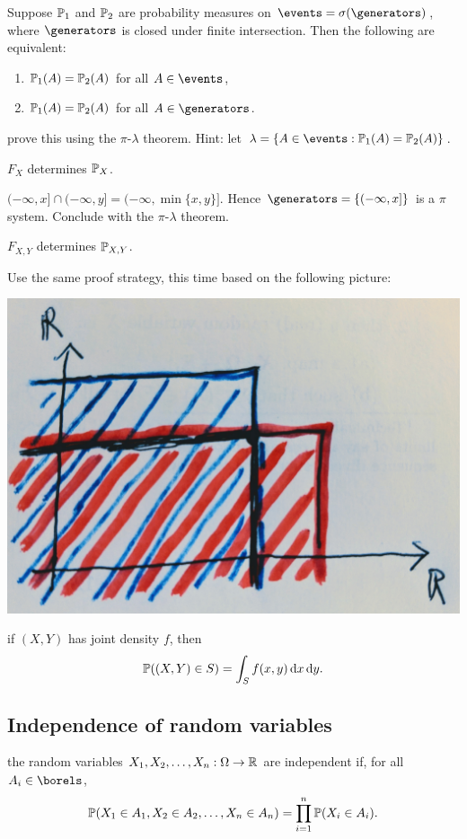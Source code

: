 \documentclass{article}
\begin{document}
 Suppose $\P_1$ and $\P_2$ are probability measures on $\events = \sigma(\generators)$, where $\generators$ is closed under finite intersection. Then the following are equivalent:
\begin{enumerate}
  \item $\P_1(A) = \P_2(A)$ for all $A \in \events$,
  \item $\P_1(A) = \P_2(A)$ for all $A \in \generators$.
\end{enumerate}

 prove this using the $\pi$-$\lambda$ theorem. Hint: let $\lambda = \{A \in \events : \P_1(A) = \P_2(A)\}$.

 $F_{X}$ determines $\P_{X}$.

 $(-\infty, x] \cap (-\infty, y] = (-\infty, \min\{x, y\}]$. Hence $\generators = \{(-\infty, x]\}$ is a $\pi$ system. Conclude with the $\pi$-$\lambda$ theorem. 

 $F_{X,Y}$ determines $\P_{X,Y}$.

 Use the same proof strategy, this time based on the following picture:
\begin{center}
	\includegraphics[width=0.5\linewidth]{figures/intersection}
\end{center}

 if $(X,Y)$ has joint density $f$, then
\[ \P((X, Y) \in S) = \int_S f(x,y) \ud x \ud y. \]


\subsection{Independence of random variables}


 the random variables $X_1, X_2, \dots, X_n : \Omega \to \R$ are independent if, for all $A_i \in \borels$, \[ \P(X_1 \in A_1, X_2 \in A_2, \dots, X_n \in A_n) = \prod_{i=1}^n \P(X_i \in A_i). \]
\end{document}
